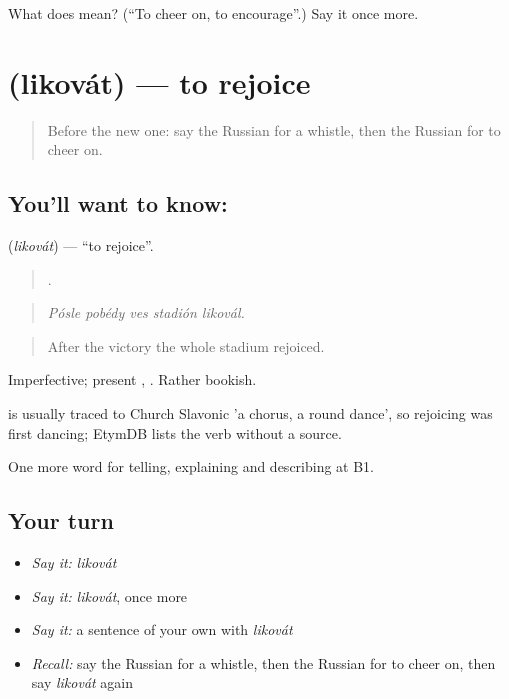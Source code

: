 \begin{tcolorbox}[breakable,colback=teal!4,colframe=teal!35!black,title={Before you move on}]
What does  mean? (\textquotedblleft{}To cheer on, to encourage\textquotedblright{}.) Say it once more.
\end{tcolorbox}
\section[\texorpdfstring{\ru{ликовать} (likovát)}{ликовать (likovát)}]{ (likovát) — to rejoice}

\label{lesson:RU-C508-likovat}



\begin{quote}
Before the new one: say the Russian for a whistle, then the Russian for to cheer on.
\end{quote}

\subsection*{You'll want to know: }
\textbf{} (\emph{likovát}) — \textquotedblleft{}to rejoice\textquotedblright{}.

\begin{quote}
    .
\end{quote}

\begin{quote}
\emph{Pósle pobédy ves stadión likovál.}
\end{quote}

\begin{quote}
After the victory the whole stadium rejoiced.
\end{quote}

Imperfective; present , . Rather bookish.

\begin{cousinweb}
\emph{} is usually traced to Church Slavonic \emph{} 'a chorus, a round dance', so rejoicing was first dancing; EtymDB lists the verb without a source.
\end{cousinweb}

\begin{grammarlens}[title={What you've built}]
One more word for telling, explaining and describing at B1.
\end{grammarlens}

\subsection*{Your turn}
\begin{itemize}
\raggedright
  \item \emph{Say it:} \emph{likovát}
  \item \emph{Say it:} \emph{likovát}, once more
  \item \emph{Say it:} a sentence of your own with \emph{likovát}
  \item \emph{Recall:} say the Russian for a whistle, then the Russian for to cheer on, then say \emph{likovát} again
\end{itemize}

